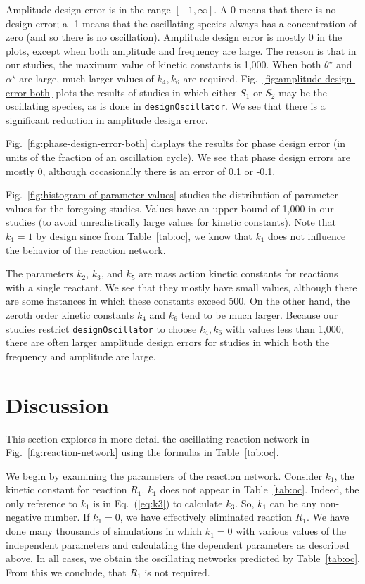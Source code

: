 \documentclass{bmcart}
\newcommand{\eqn}[1]{Eq.~(\ref{#1})}
\newcommand{\fig}[1]{Fig.~\ref{#1}}
\newcommand{\tab}[1]{Table~\ref{#1}}
\begin{document}
Amplitude design error is in the range $[-1, \infty]$. A 0 means that there is no design error; a -1 means that the oscillating species always has a concentration of zero (and so there is no oscillation). Amplitude design error is mostly 0 in the plots, except when both amplitude and frequency are large. The reason is that in our studies, the maximum value of kinetic constants is 1,000. When both $\theta^{\star}$ and $\alpha^{\star}$ are large, much larger values of $k_4, k_6$ are required. \fig{fig:amplitude-design-error-both} plots the results of studies in which either $S_1$ or $S_2$ may be the oscillating species, as is done in {\tt designOscillator}. We see that there is a significant reduction in amplitude design error.

\fig{fig:phase-design-error-both} displays the results for phase design error (in units of the fraction of an oscillation cycle). We see that phase design errors are mostly 0, although occasionally there is an error of 0.1 or -0.1.

\fig{fig:histogram-of-parameter-values} studies the distribution of parameter values for the foregoing studies. Values have an upper bound of 1,000 in our studies (to avoid unrealistically large values for kinetic constants). Note that $k_1=1$ by design since from \tab{tab:oc}, we know that $k_1$ does not influence the behavior of the reaction network.

The parameters $k_2$, $k_3$, and $k_5$ are mass action kinetic constants for reactions with a single reactant. We see that they mostly have small values, although there are some instances in which these constants exceed 500. On the other hand, the zeroth order kinetic constants $k_4$ and $k_6$ tend to be much larger. Because our studies restrict {\tt designOscillator} to choose $k_4, k_6$ with values less than 1,000, there are often larger amplitude design errors for studies in which both the frequency and amplitude are large.

\section*{Discussion}
This section explores in more detail the oscillating reaction network in \fig{fig:reaction-network} using the formulas in \tab{tab:oc}.

We begin by examining the parameters of the reaction network. Consider $k_1$, the kinetic constant for reaction $R_1$. $k_1$ does not appear in \tab{tab:oc}. Indeed, the only reference to $k_1$ is in \eqn{eq:k3} to calculate $k_3$. So, $k_1$ can be any non-negative number. If $k_1= 0$, we have effectively eliminated reaction $R_1$. We have done many thousands of simulations in which $k_1 = 0$ with various values of the independent parameters and calculating the dependent parameters as described above. In all cases, we obtain the oscillating networks predicted by \tab{tab:oc}. From this we conclude, that $R_1$ is not required.
\end{document}
